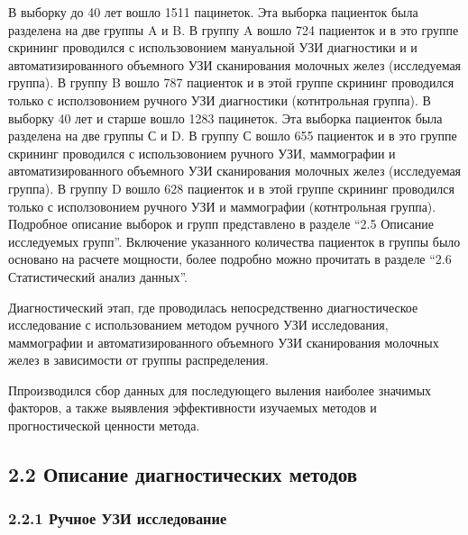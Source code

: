 \documentclass[
]{article}
\begin{document}
В выборку до 40 лет вошло 1511 пацинеток. Эта выборка пациенток была
разделена на две группы A и B. В группу A вошло 724 пациенток и в это
группе скрининг проводился с использовонием мануальной УЗИ диагностики и
и автоматизированного объемного УЗИ сканирования молочных желез
(исследуемая группа). В группу B вошло 787 пациенток и в этой группе
скрининг проводился только с исползовонием ручного УЗИ диагностики
(котнтрольная группа). В выборку 40 лет и старше вошло 1283 пацинеток.
Эта выборка пациенток была разделена на две группы С и D. В группу С
вошло 655 пациенток и в это группе скрининг проводился с использовонием
ручного УЗИ, маммографии и автоматизированного объемного УЗИ
сканирования молочных желез (исследуемая группа). В группу D вошло 628
пациенток и в этой группе скрининг проводился только с исползовонием
ручного УЗИ и маммографии (котнтрольная группа). Подробное описание
выборок и групп представлено в разделе ``2.5 Описание исследуемых
групп''. Включение указанного количества пациенток в группы было
основано на расчете мощности, более подробно можно прочитать в разделе
``2.6 Статистический анализ данных''.

Диагностический этап, где проводилась непосредственно диагностическое
исследование с использованием методом ручного УЗИ исследования,
маммографии и автоматизированного объемного УЗИ сканирования молочных
желез в зависимости от группы распределения.

Ппроизводился сбор данных для последующего выления наиболее значимых
факторов, а также выявления эффективности изучаемых методов и
прогностической ценности метода.

\hypertarget{ux43eux43fux438ux441ux430ux43dux438ux435-ux434ux438ux430ux433ux43dux43eux441ux442ux438ux447ux435ux441ux43aux438ux445-ux43cux435ux442ux43eux434ux43eux432}{%
\subsection{2.2 Описание диагностических
методов}\label{ux43eux43fux438ux441ux430ux43dux438ux435-ux434ux438ux430ux433ux43dux43eux441ux442ux438ux447ux435ux441ux43aux438ux445-ux43cux435ux442ux43eux434ux43eux432}}

\hypertarget{ux440ux443ux447ux43dux43eux435-ux443ux437ux438-ux438ux441ux441ux43bux435ux434ux43eux432ux430ux43dux438ux435}{%
\subsubsection{2.2.1 Ручное УЗИ
исследование}\label{ux440ux443ux447ux43dux43eux435-ux443ux437ux438-ux438ux441ux441ux43bux435ux434ux43eux432ux430ux43dux438ux435}}
\end{document}
